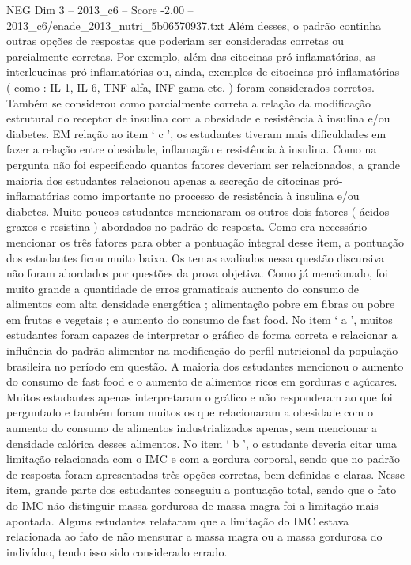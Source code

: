 \begin{textsample}{NEG Dim 3 – 2013\_c6 – Score -2.00 – 2013\_c6/enade\_2013\_nutri\_5b06570937.txt}
Além desses, o padrão continha outras opções de respostas que poderiam ser consideradas corretas ou parcialmente corretas.
Por exemplo, além das citocinas pró-inflamatórias, as interleucinas pró-inflamatórias ou, ainda, exemplos de citocinas pró-inflamatórias ( como : IL-1, IL-6, TNF alfa, INF gama etc. ) foram considerados corretos.
Também se considerou como parcialmente correta a relação da modificação estrutural do receptor de insulina com a obesidade e resistência à insulina e/ou diabetes.
EM relação ao item ‘ c ’, os estudantes tiveram mais dificuldades em fazer a relação entre obesidade, inflamação e resistência à insulina.
Como na pergunta não foi especificado quantos fatores deveriam ser relacionados, a grande maioria dos estudantes relacionou apenas a secreção de citocinas pró-inflamatórias como importante no processo de resistência à insulina e/ou diabetes.
Muito poucos estudantes mencionaram os outros dois fatores ( ácidos graxos e resistina ) abordados no padrão de resposta.
Como era necessário mencionar os três fatores para obter a pontuação integral desse item, a pontuação dos estudantes ficou muito baixa.
Os temas avaliados nessa questão discursiva não foram abordados por questões da prova objetiva.
Como já mencionado, foi muito grande a quantidade de erros gramaticais aumento do consumo de alimentos com alta densidade energética ; alimentação pobre em fibras ou pobre em frutas e vegetais ; e aumento do consumo de fast food.
No item ‘ a ’, muitos estudantes foram capazes de interpretar o gráfico de forma correta e relacionar a influência do padrão alimentar na modificação do perfil nutricional da população brasileira no período em questão.
A maioria dos estudantes mencionou o aumento do consumo de fast food e o aumento de alimentos ricos em gorduras e açúcares.
Muitos estudantes apenas interpretaram o gráfico e não responderam ao que foi perguntado e também foram muitos os que relacionaram a obesidade com o aumento do consumo de alimentos industrializados apenas, sem mencionar a densidade calórica desses alimentos.
No item ‘ b ’, o estudante deveria citar uma limitação relacionada com o IMC e com a gordura corporal, sendo que no padrão de resposta foram apresentadas três opções corretas, bem definidas e claras.
Nesse item, grande parte dos estudantes conseguiu a pontuação total, sendo que o fato do IMC não distinguir massa gordurosa de massa magra foi a limitação mais apontada.
Alguns estudantes relataram que a limitação do IMC estava relacionada ao fato de não mensurar a massa magra ou a massa gordurosa do indivíduo, tendo isso sido considerado errado.

\end{textsample}
